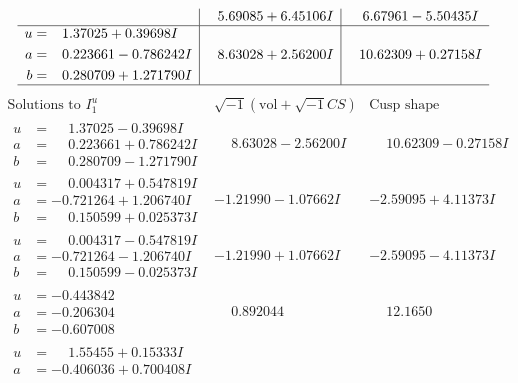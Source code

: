 \documentclass[1p]{elsarticle_modified}
\theoremstyle{definition}
\newcommand{\I}{\sqrt{-1}}
\begin{document}
$$\begin{array}{c|c|c}
 & \phantom{-}5.69085 + 6.45106 I & \phantom{-}6.67961 - 5.50435 I \\ \hline\begin{aligned}
u &= \phantom{-}1.37025 + 0.39698 I \\
a &= \phantom{-}0.223661 - 0.786242 I \\
b &= \phantom{-}0.280709 + 1.271790 I\end{aligned}
 & \phantom{-}8.63028 + 2.56200 I & \phantom{-}10.62309 + 0.27158 I\\
 \hline 
 \end{array}$$\newpage$$\begin{array}{c|c|c}  
\text{Solutions to }I^u_{1}& \I (\text{vol} + \sqrt{-1}CS) & \text{Cusp shape}\\
 \hline 
\begin{aligned}
u &= \phantom{-}1.37025 - 0.39698 I \\
a &= \phantom{-}0.223661 + 0.786242 I \\
b &= \phantom{-}0.280709 - 1.271790 I\end{aligned}
 & \phantom{-}8.63028 - 2.56200 I & \phantom{-}10.62309 - 0.27158 I \\ \hline\begin{aligned}
u &= \phantom{-}0.004317 + 0.547819 I \\
a &= -0.721264 + 1.206740 I \\
b &= \phantom{-}0.150599 + 0.025373 I\end{aligned}
 & -1.21990 - 1.07662 I & -2.59095 + 4.11373 I \\ \hline\begin{aligned}
u &= \phantom{-}0.004317 - 0.547819 I \\
a &= -0.721264 - 1.206740 I \\
b &= \phantom{-}0.150599 - 0.025373 I\end{aligned}
 & -1.21990 + 1.07662 I & -2.59095 - 4.11373 I \\ \hline\begin{aligned}
u &= -0.443842\phantom{ +0.000000I} \\
a &= -0.206304\phantom{ +0.000000I} \\
b &= -0.607008\phantom{ +0.000000I}\end{aligned}
 & \phantom{-}0.892044\phantom{ +0.000000I} & \phantom{-}12.1650\phantom{ +0.000000I} \\ \hline\begin{aligned}
u &= \phantom{-}1.55455 + 0.15333 I \\
a &= -0.406036 + 0.700408 I \\

\end{aligned}
\end{array}$$
\end{document}
